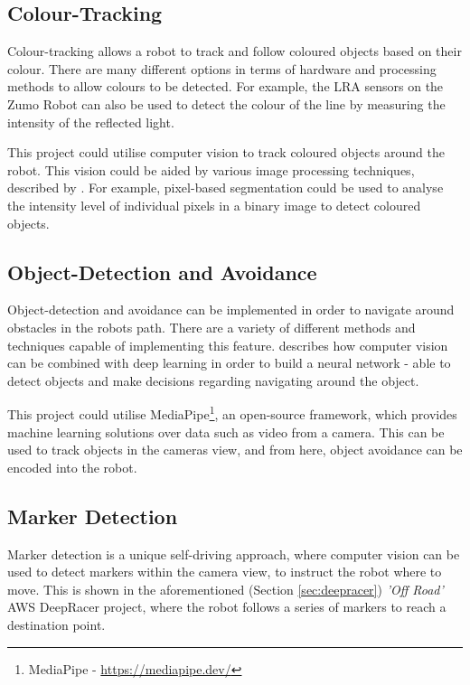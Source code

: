 \documentclass{l4proj}
\begin{document}
\subsection{Colour-Tracking}
Colour-tracking allows a robot to track and follow coloured objects based on their colour. There are many different options in terms of hardware and processing methods to allow colours to be detected. For example, the LRA sensors on the Zumo Robot can also be used to detect the colour of the line by measuring the intensity of the reflected light. 

This project could utilise computer vision to track coloured objects around the robot. This vision could be aided by various image processing techniques, described by \citet{imageprocessing}. For example, pixel-based segmentation could be used to analyse the intensity level of individual pixels in a binary image to detect coloured objects.


\subsection{Object-Detection and Avoidance}
Object-detection and avoidance can be implemented in order to navigate around obstacles in the robots path. There are a variety of different methods and techniques capable of implementing this feature. \citet{9170659} describes how computer vision can be combined with deep learning in order to build a neural network - able to detect objects and make decisions regarding navigating around the object. 

This project could utilise MediaPipe\footnote{MediaPipe - \url{https://mediapipe.dev/}}, an open-source framework, which provides machine learning solutions over data such as video from a camera. This can be used to track objects in the cameras view, and from here, object avoidance can be encoded into the robot.


\subsection{Marker Detection}\label{sec:marker-detection-analysis}
Marker detection is a unique self-driving approach, where computer vision can be used to detect markers within the camera view, to instruct the robot where to move. This is shown in the aforementioned (Section \ref{sec:deepracer}) \textit{'Off Road'} AWS DeepRacer project, where the robot follows a series of markers to reach a destination point.
\end{document}
